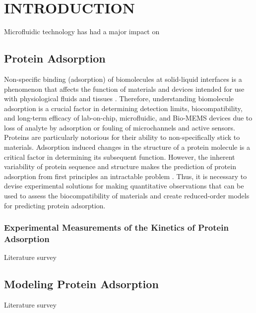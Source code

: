 
\chapter{INTRODUCTION}

Microfluidic technology has had a major impact on 


\section{Protein Adsorption}

Non-specific binding (adsorption) of biomolecules at solid-liquid
interfaces is a phenomenon that affects the function of materials
and devices intended for use with physiological fluids and tissues
\cite{Andrade1986}. Therefore, understanding biomolecule adsorption
is a crucial factor in determining detection limits, biocompatibility,
and long-term efficacy of lab-on-chip, microfluidic, and Bio-MEMS
devices due to loss of analyte by adsorption or fouling of microchannels
and active sensors. Proteins are particularly notorious for their
ability to non-specifically stick to materials. Adsorption induced
changes in the structure of a protein molecule is a critical factor
in determining its subsequent function. However, the inherent variability
of protein sequence and structure makes the prediction of protein
adsorption from first principles an intractable problem \cite{Wilson2004}.
Thus, it is necessary to devise experimental solutions for making
quantitative observations that can be used to assess the biocompatibility
of materials and create reduced-order models for predicting protein
adsorption.


\subsection{Experimental Measurements of the Kinetics of Protein Adsorption}

Literature survey


\section{Modeling Protein Adsorption}

Literature survey
